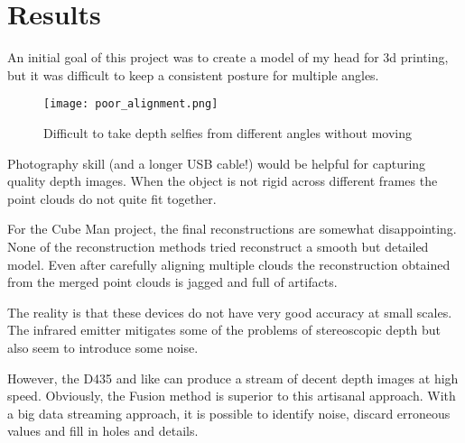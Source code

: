 \section{Results}

An initial goal of this project was to create a model of my head for 3d printing,
but it was difficult to keep a consistent posture for multiple angles.
\begin{figure}[h]
\centering
\texttt{[image: poor\_alignment.png]}
\caption{Difficult to take depth selfies from different angles without moving}
\end{figure}
Photography skill (and a longer USB cable!) would be helpful for capturing quality depth images.
When the object is not rigid across different frames the point clouds do not quite fit together.

For the Cube Man project, the final reconstructions are somewhat disappointing.
None of the reconstruction methods tried reconstruct a smooth but detailed model.
Even after carefully aligning multiple clouds the reconstruction obtained
from the merged point clouds is jagged and full of artifacts.

The reality is that these devices do not have very good accuracy at small scales.
The infrared emitter mitigates some of the problems of stereoscopic depth but
also seem to introduce some noise.

However, the D435 and like can produce a stream of decent depth images
at high speed.  Obviously, the Fusion method \cite{newcombe2011kinectfusion}
is superior to this artisanal approach. With a big data streaming approach,
it is possible to identify noise, discard erroneous values and fill in holes and details.
